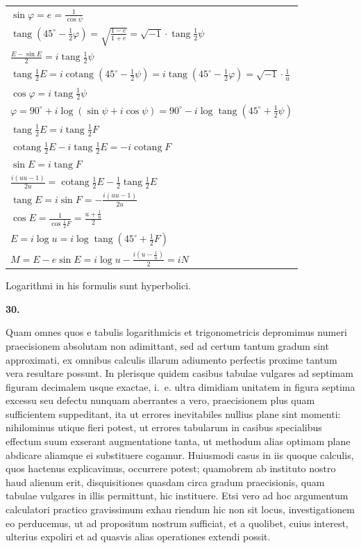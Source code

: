 \documentclass[12pt,a4paper]{book}
\newcommand{\tang}{\operatorname{tang}}
\newcommand{\cotang}{\operatorname{cotang}}
\begin{document}
\begin{center}
\begin{tabular}{@{}l@{}}
$\sin\varphi=e=\frac{1}{\cos\psi}$ \\[1ex]
$\tang(45^{\circ}-\tfrac{1}{2}\varphi)=\sqrt{\frac{1-e}{1+e}}=\sqrt{-1}\cdot\tang\tfrac{1}{2}\psi$ \\[1ex]
$\frac{E-\sin E}{2}=i\tang\tfrac{1}{2}\psi$ \\[1ex]
$\tang\tfrac{1}{2}E=i\cotang(45^{\circ}-\tfrac{1}{2}\psi)=i\tang(45^{\circ}-\tfrac{1}{2}\varphi)=\sqrt{-1}\cdot\frac{1}{u}$ \\[1ex]
$\cos\varphi=i\tang\tfrac{1}{2}\psi$ \\[1ex]
$\varphi=90^{\circ}+i\log(\sin\psi+i\cos\psi)=90^{\circ}-i\log\tang(45^{\circ}+\tfrac{1}{2}\psi)$ \\[1ex]
$\tang\tfrac{1}{2}E=i\tang\tfrac{1}{2}F$ \\[1ex]
$\cotang\tfrac{1}{2}E-i\tang\tfrac{1}{2}E=-i\cotang F$ \\[1ex]
$\sin E=i\tang F$ \\[1ex]
$\frac{i(uu-1)}{2u}=\cotang\tfrac{1}{2}E-\tfrac{1}{2}\tang\tfrac{1}{2}E$ \\[1ex]
$\tang E=i\sin F=-\frac{i(uu-1)}{2u}$ \\[1ex]
$\cos E=\frac{1}{\cos\tfrac{1}{2}F}=\frac{u+\frac{1}{u}}{2}$ \\[1ex]
$E=i\log u=i\log\tang(45^{\circ}+\tfrac{1}{2}F)$ \\[1ex]
$M=E-e\sin E=i\log u-\frac{i(u-\frac{1}{u})}{2}=iN$
\end{tabular}
\end{center}

Logarithmi in his formulis sunt hyperbolici.

\textbf{30.}

Quam omnes quos e tabulis logarithmicis et trigonometricis depromimus numeri praecisionem absolutam non adimittant, sed ad certum tantum gradum sint approximati, ex omnibus calculis illarum adiumento perfectis proxime tantum vera resultare possunt. In plerisque quidem casibus tabulae vulgares ad septimam figuram decimalem usque exactae, i.~e. ultra dimidiam unitatem in figura septima excessu seu defectu nunquam aberrantes a vero, praecisionem plus quam sufficientem suppeditant, ita ut errores inevitabiles nullius plane sint momenti: nihilominus utique fieri potest, ut errores tabularum in casibus specialibus effectum suum exserant augmentatione tanta, ut methodum alias optimam plane abdicare aliamque ei substituere cogamur. Huiusmodi casus in iis quoque calculis, quos hactenus explicavimus, occurrere potest; quamobrem ab instituto nostro haud alienum erit, disquisitiones quasdam circa gradum praecisionis, quam tabulae vulgares in illis permittunt, hic instituere. Etsi vero ad hoc argumentum calculatori practico gravissimum exhau riendum hic non sit locus, investigationem eo perducemus, ut ad propositum nostrum sufficiat, et a quolibet, cuius interest, ulterius expoliri et ad quasvis alias operationes extendi possit.
\end{document}
